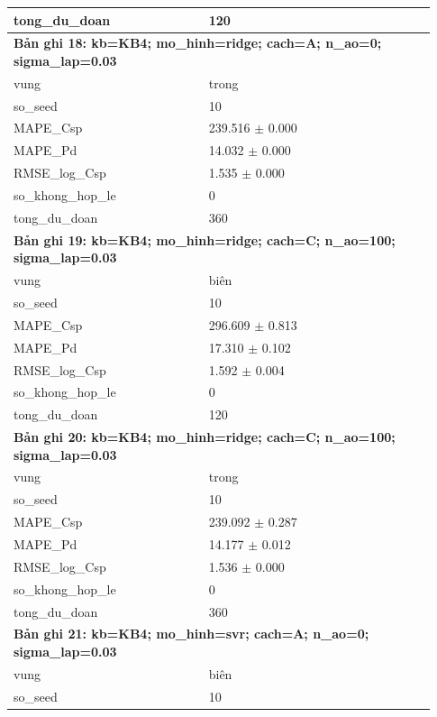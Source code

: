 \begin{longtable}{p{0.43\linewidth}p{0.50\linewidth}}
tong\_\allowbreak du\_\allowbreak doan & 120 \\
\midrule
\multicolumn{2}{p{0.95\linewidth}}{\textbf{Bản ghi 18: kb=KB4; mo\_hinh=ridge; cach=A; n\_ao=0; sigma\_lap=0.03}} \\
vung & trong \\
so\_\allowbreak seed & 10 \\
MAPE\_\allowbreak Csp & 239.516 $\pm$ 0.000 \\
MAPE\_\allowbreak Pd & 14.032 $\pm$ 0.000 \\
RMSE\_\allowbreak log\_\allowbreak Csp & 1.535 $\pm$ 0.000 \\
so\_\allowbreak khong\_\allowbreak hop\_\allowbreak le & 0 \\
tong\_\allowbreak du\_\allowbreak doan & 360 \\
\midrule
\multicolumn{2}{p{0.95\linewidth}}{\textbf{Bản ghi 19: kb=KB4; mo\_hinh=ridge; cach=C; n\_ao=100; sigma\_lap=0.03}} \\
vung & biên \\
so\_\allowbreak seed & 10 \\
MAPE\_\allowbreak Csp & 296.609 $\pm$ 0.813 \\
MAPE\_\allowbreak Pd & 17.310 $\pm$ 0.102 \\
RMSE\_\allowbreak log\_\allowbreak Csp & 1.592 $\pm$ 0.004 \\
so\_\allowbreak khong\_\allowbreak hop\_\allowbreak le & 0 \\
tong\_\allowbreak du\_\allowbreak doan & 120 \\
\midrule
\multicolumn{2}{p{0.95\linewidth}}{\textbf{Bản ghi 20: kb=KB4; mo\_hinh=ridge; cach=C; n\_ao=100; sigma\_lap=0.03}} \\
vung & trong \\
so\_\allowbreak seed & 10 \\
MAPE\_\allowbreak Csp & 239.092 $\pm$ 0.287 \\
MAPE\_\allowbreak Pd & 14.177 $\pm$ 0.012 \\
RMSE\_\allowbreak log\_\allowbreak Csp & 1.536 $\pm$ 0.000 \\
so\_\allowbreak khong\_\allowbreak hop\_\allowbreak le & 0 \\
tong\_\allowbreak du\_\allowbreak doan & 360 \\
\midrule
\multicolumn{2}{p{0.95\linewidth}}{\textbf{Bản ghi 21: kb=KB4; mo\_hinh=svr; cach=A; n\_ao=0; sigma\_lap=0.03}} \\
vung & biên \\
so\_\allowbreak seed & 10 \\

\end{longtable}
